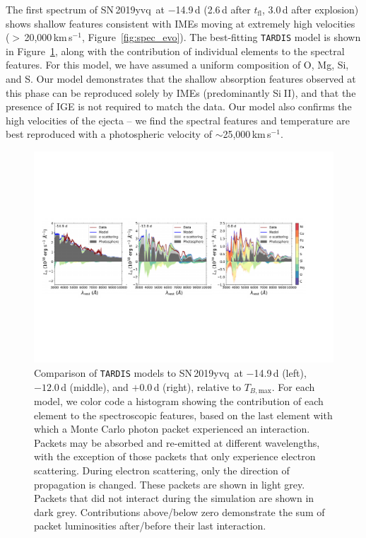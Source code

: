 \documentclass[twocolumn]{aastex63}
\def\ion#1#2{#1$\;${\footnotesize\rm{#2}}\relax}
\newcommand{\tfl}{$t_\mathrm{fl}$}
\newcommand{\tbmax}{$T_{B,\mathrm{max}}$}
\newcommand{\kms}{km\,s$^{-1}$}
\newcommand{\sn}{SN\,2019yvq}
\begin{document}
The first spectrum of \sn\ at $-$14.9\,d (2.6\,d after \tfl, 3.0\,d after
explosion) shows shallow features consistent with IMEs moving at extremely
high velocities ($>$\,20,000\,\kms, Figure~\ref{fig:spec_evo}). The
best-fitting \texttt{TARDIS} model is shown in Figure~\ref{fig:tardis}, along
with the contribution of individual elements to the spectral features. For
this model, we have assumed a uniform composition of O, Mg, Si, and S. Our
model demonstrates that the shallow absorption features observed at this phase
can be reproduced solely by IMEs (predominantly \ion{Si}{II}), and that the
presence of IGE is not required to match the data. Our model also confirms the
high velocities of the ejecta -- we find the spectral features and temperature
are best reproduced with a photospheric velocity of
$\sim$25,000\,\kms.

\begin{figure}
    \centering
    \includegraphics[width=\textwidth]{./figures/tardis.pdf}
    \caption{Comparison of \texttt{TARDIS} models to \sn\ at $-$14.9\,d
    (left), $-12.0$\,d (middle), and $+$0.0\,d (right), relative to \tbmax.
    For each model, we color code a histogram showing the contribution of each
    element to the spectroscopic features, based on the last element with
    which a Monte Carlo photon packet experienced an interaction. Packets may
    be absorbed and re-emitted at different wavelengths, with the exception of
    those packets that only experience electron scattering. During electron
    scattering, only the direction of propagation is changed. These packets
    are shown in light grey. Packets that did not interact during the
    simulation are shown in dark grey. Contributions above/below zero
    demonstrate the sum of packet luminosities after/before their last
    interaction.}
    \label{fig:tardis}
\end{figure}
\end{document}
